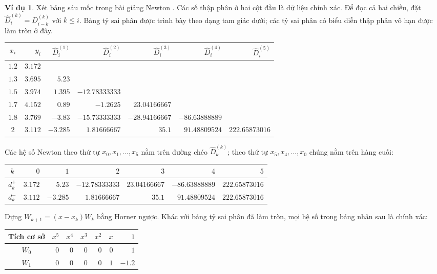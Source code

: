 \documentclass[12pt,a4paper,oneside]{book}
\numberwithin{algorithm}{chapter}
\theoremstyle{definition}
\newtheorem{vidu}{Ví dụ}[chapter]
\begin{document}
\begin{vidu}\label{vidu:newton-slide-six}
Xét bảng sáu mốc trong bài giảng Newton \cite{newton-slides}. Các số thập phân ở hai cột đầu là dữ liệu chính xác. Để đọc cả hai chiều, đặt $\widehat D_i^{(k)}=D_{i-k}^{(k)}$ với $k\leq i$. Bảng tỷ sai phân được trình bày theo dạng tam giác dưới; các tỷ sai phân có biểu diễn thập phân vô hạn được làm tròn ở đây.
\begin{center}
\small\setlength{\tabcolsep}{4pt}
\begin{tabular}{c|r|rrrrr}\toprule
$x_i$&$y_i$&$\widehat D_i^{(1)}$&$\widehat D_i^{(2)}$&$\widehat D_i^{(3)}$&$\widehat D_i^{(4)}$&$\widehat D_i^{(5)}$\\\midrule
$1.2$&$3.172$&&&&&\\
$1.3$&$3.695$&$5.23$&&&&\\
$1.5$&$3.974$&$1.395$&$-12.78333333$&&&\\
$1.7$&$4.152$&$0.89$&$-1.2625$&$23.04166667$&&\\
$1.8$&$3.769$&$-3.83$&$-15.73333333$&$-28.94166667$&$-86.63888889$&\\
$2$&$3.112$&$-3.285$&$1.81666667$&$35.1$&$91.48809524$&$222.65873016$\\\bottomrule
\end{tabular}
\end{center}
Các hệ số Newton theo thứ tự $x_0,x_1,\ldots,x_5$ nằm trên đường chéo $\widehat D_k^{(k)}$; theo thứ tự $x_5,x_4,\ldots,x_0$ chúng nằm trên hàng cuối:
\begin{center}
\small\setlength{\tabcolsep}{4pt}
\begin{tabular}{c|rrrrrr}\toprule
$k$&$0$&$1$&$2$&$3$&$4$&$5$\\\midrule
$d_k^+$&$3.172$&$5.23$&$-12.78333333$&$23.04166667$&$-86.63888889$&$222.65873016$\\
$d_k^-$&$3.112$&$-3.285$&$1.81666667$&$35.1$&$91.48809524$&$222.65873016$\\\bottomrule
\end{tabular}
\end{center}
Dựng $W_{k+1}=(x-x_k)W_k$ bằng Horner ngược. Khác với bảng tỷ sai phân đã làm tròn, mọi hệ số trong bảng nhân sau là chính xác:
\begin{center}
\small\setlength{\tabcolsep}{5pt}
\begin{tabular}{c|rrrrrr}\toprule
Tích cơ sở&$x^5$&$x^4$&$x^3$&$x^2$&$x$&$1$\\\midrule
$W_0$&$0$&$0$&$0$&$0$&$0$&$1$\\
$W_1$&$0$&$0$&$0$&$0$&$1$&$-1.2$\\

\end{tabular}
\end{center}
\end{vidu}
\end{document}
